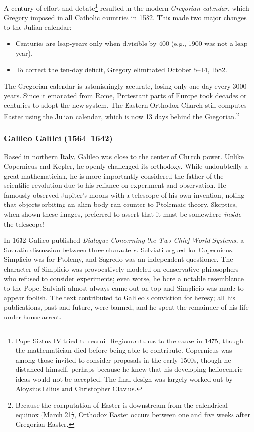 A century of effort and debate\footnote{%
	Pope Sixtus IV tried to recruit Regiomontanus to the cause in 1475, though the mathematician died before being able to contribute. Copernicus was among those invited to consider proposals in the early 1500s, though he distanced himself, perhaps because he knew that his developing heliocentric ideas would not be accepted. The final design was largely worked out by Aloysius Lilius and Christopher Clavius.%
}
resulted in the modern \emph{Gregorian calendar}, which Gregory imposed in all Catholic countries in 1582. This made two major changes to the Julian calendar:
\begin{itemize}
  \item Centuries are leap-years only when divisible by 400 (e.g., 1900 was not a leap year).
  \item To correct the ten-day deficit, Gregory eliminated October 5\th--14\th, 1582.
\end{itemize}
The Gregorian calendar is astonishingly accurate, losing only one day every 3000 years. Since it emanated from Rome, Protestant parts of Europe took decades or centuries to adopt the new system. The Eastern Orthodox Church still computes Easter using the Julian calendar, which is now 13 days behind the Gregorian.\footnote{%
	Because the computation of Easter is downstream from the calendrical equinox (March 21\st), Orthodox Easter occurs between one and five weeks after Gregorian Easter.%
}

\pagebreak[3]


\subsubsection*{Galileo Galilei (1564--1642)}\label{pg:galileo}

Based in northern Italy, Galileo was close to the center of Church power. Unlike Copernicus and Kepler, he openly challenged its orthodoxy. While undoubtedly a great mathematician, he is more importantly considered the father of the scientific revolution due to his reliance on experiment and observation. He famously observed Jupiter's moons with a telescope of his own invention, noting that objects orbiting an alien body ran counter to Ptolemaic theory. Skeptics, when shown these images, preferred to assert that it must be somewhere \emph{inside} the telescope!
\smallbreak

In 1632 Galileo published \emph{Dialogue Concerning the Two Chief World Systems,} a Socratic discussion between three characters: Salviati argued for Copernicus, Simplicio was for Ptolemy, and Sagredo was an independent questioner. The character of Simplicio was provocatively modeled on conservative philosophers who refused to consider experiments; even worse, he bore a notable resemblance to the Pope. Salviati almost always came out on top and Simplicio was made to appear foolish. The text contributed to Galileo's conviction for heresy; all his publications, past and future, were banned, and he spent the remainder of his life under house arrest.
\smallbreak

